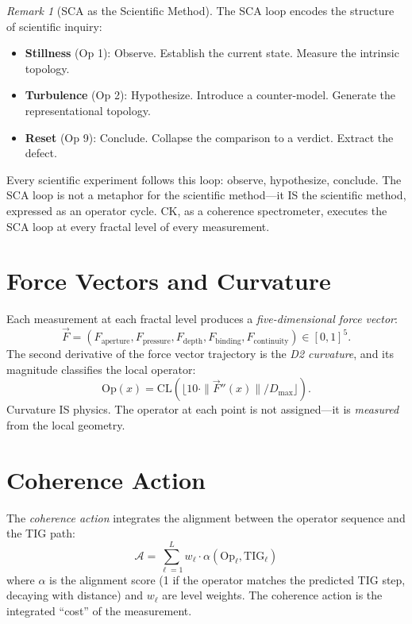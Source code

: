 \documentclass[12pt, openany]{book}
\theoremstyle{remark}
\newtheorem{remark}[theorem]{Remark}
\begin{document}
\begin{remark}[SCA as the Scientific Method]
The SCA loop encodes the structure of scientific inquiry:
\begin{itemize}
  \item \textbf{Stillness} (Op 1): Observe. Establish the current state. Measure
        the intrinsic topology.
  \item \textbf{Turbulence} (Op 2): Hypothesize. Introduce a counter-model. Generate
        the representational topology.
  \item \textbf{Reset} (Op 9): Conclude. Collapse the comparison to a verdict.
        Extract the defect.
\end{itemize}
Every scientific experiment follows this loop: observe, hypothesize, conclude.
The SCA loop is not a metaphor for the scientific method---it IS the scientific
method, expressed as an operator cycle. CK, as a coherence spectrometer, executes
the SCA loop at every fractal level of every measurement.
\end{remark}

\section{Force Vectors and Curvature}

Each measurement at each fractal level produces a \emph{five-dimensional force vector}:
\[
  \vec{F} = (F_{\mathrm{aperture}}, F_{\mathrm{pressure}}, F_{\mathrm{depth}},
             F_{\mathrm{binding}}, F_{\mathrm{continuity}}) \in [0,1]^5.
\]
The second derivative of the force vector trajectory is the \emph{D2 curvature},
and its magnitude classifies the local operator:
\[
  \mathrm{Op}(x) = \mathrm{CL}\!\left(\lfloor 10 \cdot \|\vec{F}''(x)\| / D_{\max} \rfloor\right).
\]
Curvature IS physics. The operator at each point is not assigned---it is \emph{measured}
from the local geometry.

\section{Coherence Action}

The \emph{coherence action} integrates the alignment between the operator sequence
and the TIG path:
\[
  \mathcal{A} = \sum_{\ell=1}^{L} w_\ell \cdot \alpha(\mathrm{Op}_\ell, \mathrm{TIG}_\ell)
\]
where $\alpha$ is the alignment score (1 if the operator matches the predicted TIG
step, decaying with distance) and $w_\ell$ are level weights. The coherence action
is the integrated ``cost'' of the measurement.
\end{document}

